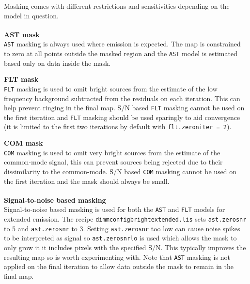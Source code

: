 \documentclass[twoside,11pt]{article}
\renewcommand{\_}{\texttt{\symbol{95}}}
\begin{document}
 Masking comes with different restrictions and sensitivities depending on the model
in question.
\\\\
\textbf{AST mask}\\
\texttt{AST} masking is always used where emission is expected. The map is constrained to zero at all points outside the masked region and the \texttt{AST} model is estimated based only on data inside the
mask.

\textbf{FLT mask}\\
\texttt{FLT} masking is used to omit bright sources from the estimate
of the low frequency background subtracted from the residuals on each
iteration. This can help prevent ringing in the final map. S/N based
\texttt{FLT} masking cannot be used on the first iteration and
\texttt{FLT} masking should be used sparingly to aid convergence (it
is limited to the first two iterations by default with
\texttt{flt.zero\_niter~=~2}).

\textbf{COM mask}\\
\texttt{COM} masking is used to omit very bright sources from the
estimate of the common-mode signal, this can prevent sources being
rejected due to their dissimilarity to the common-mode. S/N based
\texttt{COM} masking cannot be used on the first iteration and the
mask should always be small.
\\\\
\textbf{Signal-to-noise based masking}\\
Signal-to-noise based masking is used for both the \texttt{AST} and \texttt{FLT} models for extended emission. The recipe \texttt{dimmconfig\_bright\_extended.lis} sets \texttt{ast.zero\_snr} to 5 and \texttt{ast.zero\_snr} to 3. Setting \texttt{ast.zero\_snr} too low can cause noise spikes to be interpreted as signal so  \texttt{ast.zero\_snrlo} is used which allows the mask to only grow it it includes pixels with the specified  S/N. This typically improves the resulting map so is worth experimenting with. Note that \texttt{AST} masking is not applied on the final iteration to allow data outside the mask to remain in the final map.
\end{document}
